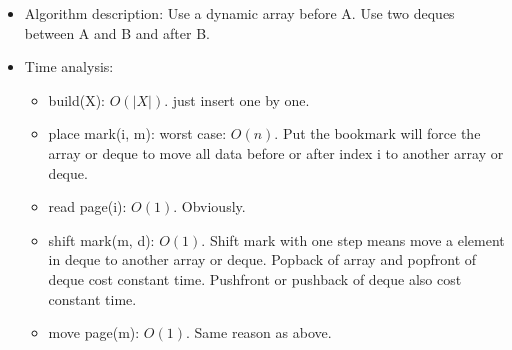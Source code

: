 \documentclass[12pt,twoside]{article}
\begin{document}
\begin{problems}
\problem  %
\begin{itemize}
    \item Algorithm description: Use a dynamic array before A. Use two deques between A and B and after B.
    \item Time analysis: 
        \begin{itemize}
            \item build(X): $O(|X|)$. just insert one by one. 
            \item place mark(i, m): worst case: $O(n)$. Put the bookmark will force the array or deque
            to move all data before or after index i to another array or deque.
            \item read page(i): $O(1)$. Obviously.
            \item shift mark(m, d): $O(1)$. Shift mark with one step means move a element in deque to 
            another array or deque.
            Popback of array and popfront of deque cost constant time.
            Pushfront or pushback of deque also cost constant time.
            \item move page(m): $O(1)$. Same reason as above.
        \end{itemize}
\end{itemize}

\problem  %


\end{problems}
\end{document}
